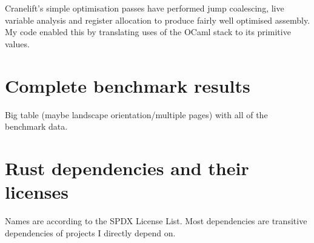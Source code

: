 Cranelift's simple optimisation passes have performed jump coalescing, live variable analysis and
register allocation
to produce fairly well optimised assembly. My code enabled this by translating uses of the OCaml
stack to its primitive values.

\chapter{Complete benchmark results}

Big table (maybe landscape orientation/multiple pages) with all of the benchmark data.

\chapter{Rust dependencies and their licenses} \label{appendix-license}

Names are according to the SPDX License List. Most dependencies are transitive dependencies
of projects I directly depend on.

